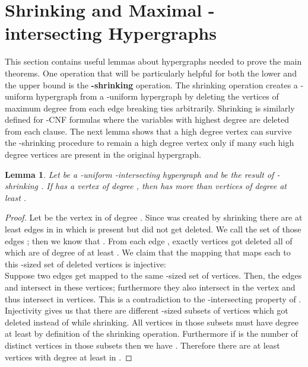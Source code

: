 \documentclass[11pt,letterpaper]{article}
\newtheorem{lemma}[theorem]{Lemma}
\begin{document}
\section{Shrinking and Maximal -intersecting Hypergraphs}\label{sec:shrinking-hypergraphs}
This section contains useful lemmas about hypergraphs needed to prove the main theorems. One operation that will be particularly helpful for both the lower and the upper bound is the {\bfseries -shrinking} operation. The shrinking operation creates a -uniform hypergraph  from a -uniform hypergraph  by deleting the  vertices of maximum degree from each edge breaking ties arbitrarily. Shrinking is similarly defined for -CNF formulas where the variables with highest degree are deleted from each clause. The next lemma shows that a high degree vertex can survive the -shrinking procedure to remain a high degree vertex only if many such high degree vertices are present in the original hypergraph.\\
 
\begin{lemma}\label{lemma:shrinking}
Let  be a -uniform -intersecting hypergraph and  be the result of -shrinking . If  has a vertex of degree , then  has more than  vertices of degree at least . 
\end{lemma}

\begin{proof}
Let  be the vertex in  of degree . Since  was created by shrinking  there are at least  edges in  in which  is present but did not get deleted. We call the set of those edges ; then we know that . From each edge , exactly  vertices got deleted all of which are of degree of at least . We claim that the mapping that maps each  to this -sized set of deleted vertices is injective:\\
 
Suppose two edges  get mapped to the same -sized set of vertices. Then, the edges  and  intersect in these  vertices; furthermore they also intersect in the vertex  and thus intersect in  vertices. This is a contradiction to the -intersecting property of .\\

Injectivity gives us that there are  different -sized subsets of vertices which got deleted instead of  while shrinking. All vertices in those subsets must have degree at least  by definition of the shrinking operation. Furthermore if  is the number of distinct vertices in those subsets then we have . Therefore there are at least  vertices with degree at least  in . 
\end{proof}
\end{document}
